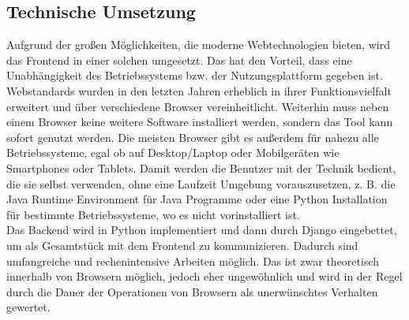 \subsection{Technische Umsetzung}
Aufgrund der großen Möglichkeiten, die moderne Webtechnologien bieten, wird das
Frontend in einer solchen umgesetzt. Das hat den Vorteil, dass eine
Unabhängigkeit des Betriebssystems bzw. der Nutzungsplattform gegeben ist. Webstandards wurden in
den letzten Jahren erheblich in ihrer Funktionsvielfalt erweitert und über
verschiedene Browser vereinheitlicht. Weiterhin muss neben einem Browser keine
weitere Software installiert werden, sondern das Tool kann sofort genutzt
werden. Die meisten Browser gibt es außerdem für nahezu alle Betriebssysteme,
egal ob auf Desktop/Laptop oder Mobilgeräten wie Smartphones oder Tablets. Damit
werden die Benutzer mit der Technik bedient, die sie selbst verwenden, ohne
eine Laufzeit Umgebung vorauszusetzen, z. B. die Java Runtime Environment für
Java Programme oder eine Python Installation für bestimmte
Betriebssysteme, wo es nicht vorinstalliert ist.\\
Das Backend wird in Python implementiert und dann durch Django eingebettet, um
als Gesamtstück mit dem Frontend zu kommunizieren. Dadurch sind umfangreiche und
rechenintensive Arbeiten möglich. Das ist zwar theoretisch innerhalb von
Browsern möglich, jedoch eher ungewöhnlich und wird in der Regel durch die Dauer
der Operationen von Browsern als unerwünschtes Verhalten gewertet.

\pagebreak[4]